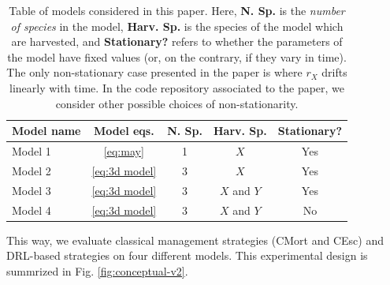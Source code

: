 \documentclass{article}
\begin{document}
\begin{table}
  \begin{center}
    \begin{tabular}{|l|c|c|c|c|}
      \hline
      \textbf{Model name} & \textbf{Model eqs.} & \textbf{N. Sp.} & \textbf{Harv. Sp.} & \textbf{Stationary?}\\
      \hline
      Model 1 & \eqref{eq:may} & 1 & $X$ & Yes \\
      Model 2 & \eqref{eq:3d model} & 3 & $X$ & Yes \\
      Model 3 & \eqref{eq:3d model} & 3 & $X$ and $Y$ & Yes \\
      Model 4 & \eqref{eq:3d model} & 3 & $X$ and $Y$ & No \\
      \hline
    \end{tabular}
    \caption{Table of models considered in this paper. Here, \textbf{N. Sp.} is the \emph{number of species} in the model, \textbf{Harv. Sp.} is the species of the model which are harvested, and \textbf{Stationary?} refers to whether the parameters of the model have fixed values (or, on the contrary, if they vary in time). The only non-stationary case presented in the paper is where $r_X$ drifts linearly with time. In the code repository associated to the paper, we consider other possible choices of non-stationarity.}
    \label{tab:models}
  \end{center}
\end{table}

This way, we evaluate classical management strategies (CMort and CEsc)
and DRL-based strategies on four different models. This experimental
design is summrized in Fig. \ref{fig:conceptual-v2}.
\end{document}
